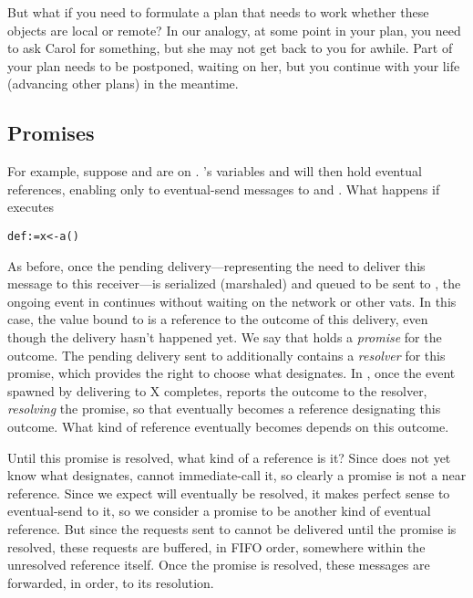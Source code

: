 \documentclass{llncs}
\begin{document}
But what if you need to formulate a plan that needs to work whether
these objects are local or remote? In our analogy, at some point in
your plan, you need to ask Carol for something, but she may not get
back to you for awhile. Part of your plan needs to be postponed,
waiting on her, but you continue with your life (advancing other
plans) in the meantime.

\subsection{Promises}

For example, suppose  and  are on .
's variables  and  will then hold eventual
references, enabling  only to eventual-send messages to
 and . What happens if  executes
%
\begin{alltt}
    def  := x <- a()
\end{alltt}
%
As before, once the pending delivery---representing the need to
deliver this message to this receiver---is serialized (marshaled) and
queued to be sent to , the ongoing event in  continues
without waiting on the network or other vats. In this case, the value
bound to  is a reference to the outcome of this delivery, even
though the delivery hasn't happened yet. We say that  holds a
\emph{promise} for the outcome. The pending delivery sent to 
additionally contains a \emph{resolver} for this promise, which
provides the right to choose what  designates. In ,
once the event spawned by delivering  to X completes,
 reports the outcome to the resolver, \emph{resolving} the
promise, so that  eventually becomes a reference designating
this outcome. What kind of reference  eventually becomes
depends on this outcome.

Until this promise is resolved, what kind of a reference is it? Since
 does not yet know what  designates,  cannot
immediate-call it, so clearly a promise is not a near reference. Since
we expect  will eventually be resolved, it makes perfect sense
to eventual-send to it, so we consider a promise to be another kind of
eventual reference. But since the requests sent to  cannot be
delivered until the promise is resolved, these requests are buffered,
in FIFO order, somewhere within the unresolved reference itself. Once
the promise is resolved, these messages are forwarded, in order, to
its resolution.
\end{document}
